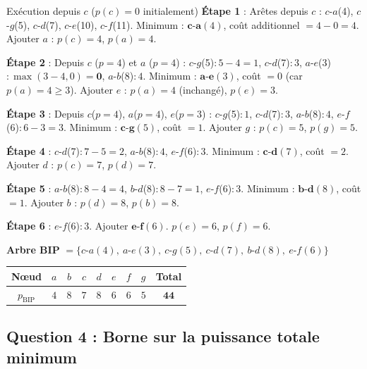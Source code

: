 \documentclass[12pt,a4paper]{article}
\begin{document}
\begin{etape}{Exécution depuis $c$ ($p(c)=0$ initialement)}
\textbf{Étape 1} : Arêtes depuis $c$ : 
$c$-$a$(4), $c$-$g$(5), $c$-$d$(7), $c$-$e$(10), $c$-$f$(11). 
Minimum : $\mathbf{c}$-$\mathbf{a}(4)$, coût additionnel $=4-0=4$.
Ajouter $a$ : $p(c)=4$, $p(a)=4$.

\textbf{Étape 2} : Depuis $c$ ($p=4$) et $a$ ($p=4$) :
$c$-$g$(5)$: 5-4=1$, $c$-$d$(7)$: 3$, $a$-$e$(3)$: \max(3-4,0)=\mathbf{0}$, $a$-$b$(8)$: 4$.
Minimum : $\mathbf{a}$-$\mathbf{e}(3)$, coût $=0$ (car $p(a)=4 \ge 3$).
Ajouter $e$ : $p(a)=4$ (inchangé), $p(e)=3$.

\textbf{Étape 3} : Depuis $c$($p=4$), $a$($p=4$), $e$($p=3$) :
$c$-$g$(5)$: 1$, $c$-$d$(7)$: 3$, $a$-$b$(8)$: 4$, $e$-$f$(6)$: 6-3=3$.
Minimum : $\mathbf{c}$-$\mathbf{g}(5)$, coût $=1$.
Ajouter $g$ : $p(c)=5$, $p(g)=5$.

\textbf{Étape 4} : 
$c$-$d$(7)$: 7-5=2$, $a$-$b$(8)$: 4$, $e$-$f$(6)$: 3$.
Minimum : $\mathbf{c}$-$\mathbf{d}(7)$, coût $=2$.
Ajouter $d$ : $p(c)=7$, $p(d)=7$.

\textbf{Étape 5} :
$a$-$b$(8)$: 8-4=4$, $b$-$d$(8)$: 8-7=1$, $e$-$f$(6)$: 3$.
Minimum : $\mathbf{b}$-$\mathbf{d}(8)$, coût $=1$.
Ajouter $b$ : $p(d)=8$, $p(b)=8$.

\textbf{Étape 6} :
$e$-$f$(6)$: 3$.
Ajouter $\mathbf{e}$-$\mathbf{f}(6)$.
$p(e)=6$, $p(f)=6$.
\end{etape}

\begin{resultat}
\textbf{Arbre BIP} $= \{c$-$a(4),\ a$-$e(3),\ c$-$g(5),\ c$-$d(7),\ b$-$d(8),\ e$-$f(6)\}$

\begin{center}
\begin{tabular}{|c|c|c|c|c|c|c|c||c|}
\hline
\textbf{Nœud} & $a$ & $b$ & $c$ & $d$ & $e$ & $f$ & $g$ & \textbf{Total} \\\hline
$p_{\text{BIP}}$ & $4$ & $8$ & $7$ & $8$ & $6$ & $6$ & $5$ & $\mathbf{44}$ \\\hline
\end{tabular}
\end{center}
\end{resultat}

\subsection{Question 4 : Borne sur la puissance totale minimum}
\end{document}

